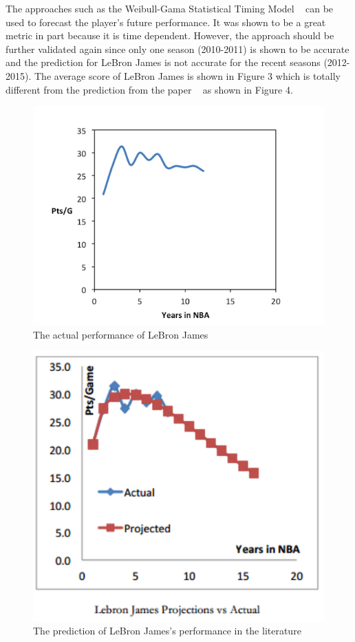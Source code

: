 \documentclass{acm_proc_article-sp}
\begin{document}
The approaches such as the Weibull-Gama Statistical Timing Model  ~\cite{wgstm} can be used to forecast the player's future performance. It was shown to be a great metric in part because it is time dependent. However, the approach should be further validated again since only one season (2010-2011) is shown to be accurate and the prediction for LeBron James is not accurate for the recent seasons (2012-2015). The average score of LeBron James is shown in Figure 3 which is totally different from the prediction from the paper  ~\cite{wgstm} as shown in Figure 4.

\begin{figure}[!htb]
\includegraphics{Fig3.png}
\caption{The actual performance of LeBron James}
\end{figure}

\begin{figure}[!htb]
\includegraphics{Fig4.png}
\caption{The prediction of LeBron James's performance in the literature  ~\cite{wgstm}}
\end{figure}
\end{document}
